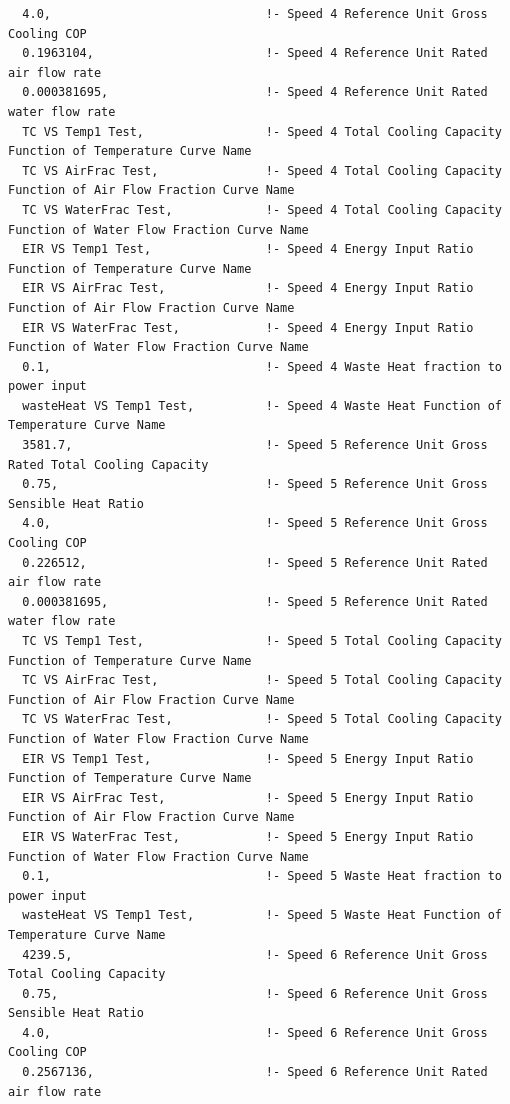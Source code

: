 \begin{lstlisting}
  4.0,                              !- Speed 4 Reference Unit Gross Cooling COP
  0.1963104,                        !- Speed 4 Reference Unit Rated air flow rate
  0.000381695,                      !- Speed 4 Reference Unit Rated water flow rate
  TC VS Temp1 Test,                 !- Speed 4 Total Cooling Capacity Function of Temperature Curve Name
  TC VS AirFrac Test,               !- Speed 4 Total Cooling Capacity Function of Air Flow Fraction Curve Name
  TC VS WaterFrac Test,             !- Speed 4 Total Cooling Capacity Function of Water Flow Fraction Curve Name
  EIR VS Temp1 Test,                !- Speed 4 Energy Input Ratio Function of Temperature Curve Name
  EIR VS AirFrac Test,              !- Speed 4 Energy Input Ratio Function of Air Flow Fraction Curve Name
  EIR VS WaterFrac Test,            !- Speed 4 Energy Input Ratio Function of Water Flow Fraction Curve Name
  0.1,                              !- Speed 4 Waste Heat fraction to power input
  wasteHeat VS Temp1 Test,          !- Speed 4 Waste Heat Function of Temperature Curve Name
  3581.7,                           !- Speed 5 Reference Unit Gross Rated Total Cooling Capacity
  0.75,                             !- Speed 5 Reference Unit Gross Sensible Heat Ratio
  4.0,                              !- Speed 5 Reference Unit Gross Cooling COP
  0.226512,                         !- Speed 5 Reference Unit Rated air flow rate
  0.000381695,                      !- Speed 5 Reference Unit Rated water flow rate
  TC VS Temp1 Test,                 !- Speed 5 Total Cooling Capacity Function of Temperature Curve Name
  TC VS AirFrac Test,               !- Speed 5 Total Cooling Capacity Function of Air Flow Fraction Curve Name
  TC VS WaterFrac Test,             !- Speed 5 Total Cooling Capacity Function of Water Flow Fraction Curve Name
  EIR VS Temp1 Test,                !- Speed 5 Energy Input Ratio Function of Temperature Curve Name
  EIR VS AirFrac Test,              !- Speed 5 Energy Input Ratio Function of Air Flow Fraction Curve Name
  EIR VS WaterFrac Test,            !- Speed 5 Energy Input Ratio Function of Water Flow Fraction Curve Name
  0.1,                              !- Speed 5 Waste Heat fraction to power input
  wasteHeat VS Temp1 Test,          !- Speed 5 Waste Heat Function of Temperature Curve Name
  4239.5,                           !- Speed 6 Reference Unit Gross Total Cooling Capacity
  0.75,                             !- Speed 6 Reference Unit Gross Sensible Heat Ratio
  4.0,                              !- Speed 6 Reference Unit Gross Cooling COP
  0.2567136,                        !- Speed 6 Reference Unit Rated air flow rate

\end{lstlisting}

